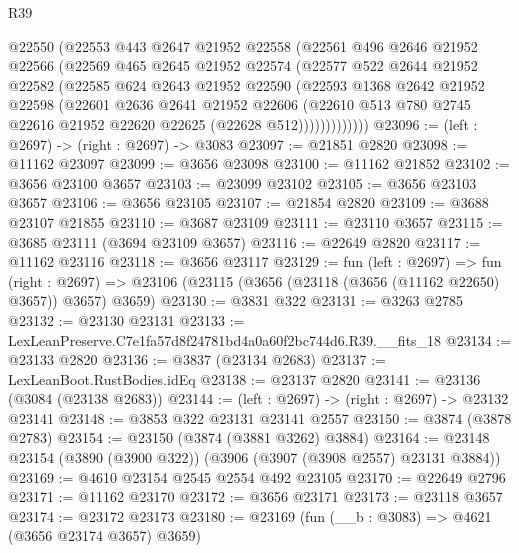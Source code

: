\begin{lexlean}{R39}
\begin{coremodule}
            @22550
            (@22553
              @443
              @2647
              @21952
              @22558
              (@22561
                @496
                @2646
                @21952
                @22566
                (@22569
                  @465
                  @2645
                  @21952
                  @22574
                  (@22577
                    @522
                    @2644
                    @21952
                    @22582
                    (@22585
                      @624
                      @2643
                      @21952
                      @22590
                      (@22593
                        @1368
                        @2642
                        @21952
                        @22598
                        (@22601
                          @2636
                          @2641
                          @21952
                          @22606
                          (@22610
                            @513
                            @780
                            @2745
                            @22616
                            @21952
                            @22620
                            @22625
                            (@22628 @512)))))))))))))
@23096 := (left : @2697) -> (right : @2697) -> @3083
@23097 := @21851 @2820
@23098 := @11162 @23097
@23099 := @3656 @23098
@23100 := @11162 @21852
@23102 := @3656 @23100 @3657
@23103 := @23099 @23102
@23105 := @3656 @23103 @3657
@23106 := @3656 @23105
@23107 := @21854 @2820
@23109 := @3688 @23107 @21855
@23110 := @3687 @23109
@23111 := @23110 @3657
@23115 := @3685 @23111 (@3694 @23109 @3657)
@23116 := @22649 @2820
@23117 := @11162 @23116
@23118 := @3656 @23117
@23129 := fun (left : @2697) =>
  fun (right : @2697) => @23106 (@23115 (@3656 (@23118 (@3656 (@11162 @22650) @3657)) @3657) @3659)
@23130 := @3831 @322
@23131 := @3263 @2785
@23132 := @23130 @23131
@23133 := LexLeanPreserve.C7e1fa57d8f24781bd4a0a60f2bc744d6.R39.__fits_18
@23134 := @23133 @2820
@23136 := @3837 (@23134 @2683)
@23137 := LexLeanBoot.RustBodies.idEq
@23138 := @23137 @2820
@23141 := @23136 (@3084 (@23138 @2683))
@23144 := (left : @2697) -> (right : @2697) -> @23132 @23141
@23148 := @3853 @322 @23131 @23141 @2557
@23150 := @3874 (@3878 @2783)
@23154 := @23150 (@3874 (@3881 @3262) @3884)
@23164 := @23148 @23154 (@3890 (@3900 @322)) (@3906 (@3907 (@3908 @2557) @23131 @3884))
@23169 := @4610 @23154 @2545 @2554 @492 @23105
@23170 := @22649 @2796
@23171 := @11162 @23170
@23172 := @3656 @23171
@23173 := @23118 @3657
@23174 := @23172 @23173
@23180 := @23169 (fun (__b : @3083) => @4621 (@3656 @23174 @3657) @3659)

\end{coremodule}
\end{lexlean}
